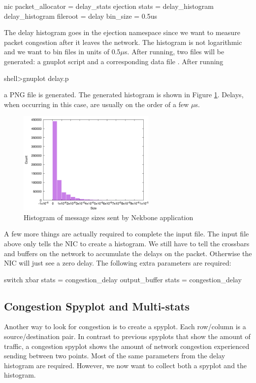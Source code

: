 \begin{ViFile}
nic {
 packet_allocator = delay_stats
 ejection {
  stats = delay_histogram
  delay_histogram {
   fileroot = delay
   bin_size = 0.5us
  }
 }
}
\end{ViFile}
The delay histogram goes in the ejection namespace since we want to measure packet congestion after it leaves the network.
The histogram is not logarithmic and we want to bin files in units of 0.5$\mu$s.
After running, two files will be generated: a gnuplot script and a corresponding data file .
After running
\begin{ShellCmd}
shell>gnuplot delay.p 
\end{ShellCmd}
a PNG file  is generated.
The generated histogram is shown in Figure \ref{fig:nekboneDelayHistogram}. 
Delays, when occurring in this case, are usually on the order of a few $\mu$s.

\begin{figure}
\centering
\includegraphics[width=0.6\textwidth]{figures/delayHistogramNekbone}
\caption{Histogram of message sizes sent by Nekbone application}
\label{fig:nekboneDelayHistogram}
\end{figure}

A few more things are actually required to complete the input file.
The input file above only tells the NIC to create a histogram.
We still have to tell the crossbars and buffers on the network to accumulate the delays on the packet.
Otherwise the NIC will just see a zero delay.
The following extra parameters are required:

\begin{ViFile}
switch {
 xbar {
   stats = congestion_delay
 }
 output_buffer {
  stats = congestion_delay
 }
}
\end{ViFile}

\subsection{Congestion Spyplot and Multi-stats}
Another way to look for congestion is to create a spyplot.
Each row/column is a source/destination pair.
In contrast to previous spyplots that show the amount of traffic,
a congestion spyplot shows the amount of network congestion experienced sending between two points.
Most of the same parameters from the delay histogram are required.
However, we now want to collect both a spyplot and the histogram.

